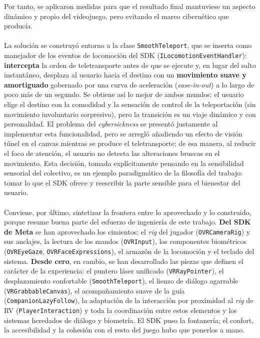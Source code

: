 \documentclass[12pt,twoside,titlepage]{report}
\begin{document}
Por tanto, se aplicaron medidas para que el resultado final mantuviese un aspecto dinámico y propio del videojuego, pero evitando el mareo cibernético que producía.\\
\\
La solución se construyó entorno a la clase \texttt{SmoothTeleport}, que se inserta como manejador de los eventos de locomoción del SDK (\texttt{ILocomotionEventHandler}): \textbf{intercepta} la orden de teletransporte antes de que se ejecute y, en lugar del salto instantáneo, desplaza al usuario hacia el destino con un \textbf{movimiento suave y amortiguado} gobernado por una curva de aceleración (\textit{ease-in-out}) a lo largo de poco más de un segundo.
Se obtiene así lo mejor de ambos mundos: el usuario elige el destino con la comodidad y la sensación de control de la teleportación (sin movimiento involuntario sorpresivo), pero la transición es un viaje dinámico y con personalidad.
El problema del \textit{cybersickness} se presentó justamente al implementar esta funcionalidad, pero se arregló añadiendo un efecto de visión túnel en el canvas mientras se produce el teletransporte; de esa manera, al reducir el foco de atención, el usuario no detecta las alteraciones bruscas en el movimiento.
Esta decisión, tomada explícitamente pensando en la sensibilidad sensorial del colectivo, es un ejemplo paradigmático de la filosofía del trabajo: tomar lo que el SDK ofrece y reescribir la parte sensible para el bienestar del usuario.\\
\\
Conviene, por último, sintetizar la frontera entre lo aprovechado y lo construido, porque resume buena parte del esfuerzo de ingeniería de este trabajo.
\textbf{Del SDK de Meta} se han aprovechado los cimientos: el \textit{rig} del jugador (\texttt{OVRCameraRig}) y sus anclajes, la lectura de los mandos (\texttt{OVRInput}), los componentes biométricos (\texttt{OVREyeGaze}, \texttt{OVRFaceExpressions}), el armazón de la locomoción y el teclado del sistema.
\textbf{Desde cero}, en cambio, se han desarrollado las piezas que definen el carácter de la experiencia: el puntero láser unificado (\texttt{VRRayPointer}), el desplazamiento confortable (\texttt{SmoothTeleport}), el lienzo de diálogo agarrable (\texttt{VRGrabbableCanvas}), el acompañamiento suave de la guía (\texttt{CompanionLazyFollow}), la adaptación de la interacción por proximidad al \textit{rig} de RV (\texttt{PlayerInteraction}) y toda la coordinación entre estos elementos y los sistemas heredados de diálogo y biometría.
El SDK puso la fontanería; el confort, la accesibilidad y la cohesión con el resto del juego hubo que ponerlos a mano.\\
\end{document}
